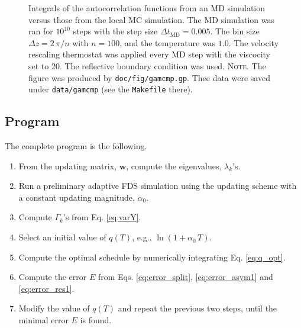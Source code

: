 \documentclass[reprint, floatfix]{revtex4-1}
\newcommand{\note}[1]{{\color{DarkGreen}\footnotesize \textsc{Note.} #1}}
\begin{document}
\begin{figure}[h]
\begin{center}
  \caption{
    \label{fig:gamcmp}
    Integrals of the autocorrelation functions
    from an MD simulation versus those
    from the local MC simulation.
    The MD simulation was ran for $10^{10}$ steps with
    the step size $\Delta t_\mathrm{MD} = 0.005$.
    The bin size $\Delta z = 2\, \pi /n$ with $n = 100$,
    and the temperature was $1.0$.
    The velocity rescaling\cite{bussi2007} thermostat was
    applied every MD step with the viscocity set to 20.
    The reflective boundary condition was used.
    \note{The figure was produced by \texttt{doc/fig/gamcmp.gp}.
      Thee data were saved under \texttt{data/gamcmp}
      (see the \texttt{Makefile} there).
    }%
  }
\end{center}
\end{figure}





\subsection{\label{sec:program_list}
Program
}


The complete program is the following.

\begin{enumerate}

\item
From the updating matrix, $\mathbf w$,
compute the eigenvalues, $\lambda_k$'s.

\item
Run a preliminary adaptive FDS simulation
using the updating scheme with a constant
updating magnitude, $\alpha_0$.

\item
Compute $\Gamma_k$'s from Eq. \eqref{eq:varY}.

\item
Select an initial value of $q(T)$,
e.g., $\ln(1 + \alpha_0 \, T)$.

\item
Compute the optimal schedule by
numerically integrating Eq. \eqref{eq:q_opt}.

\item
Compute the error $E$ from
Eqs. \eqref{eq:error_split},
  \eqref{eq:error_asym1} and
  \eqref{eq:error_res1}.

\item
Modify the value of $q(T)$ and repeat the previous two steps,
until the minimal error $E$ is found.

\end{enumerate}
\end{document}
